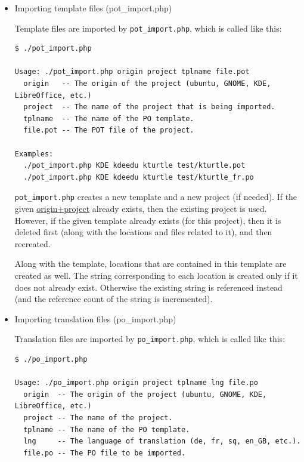 \documentclass[11pt]{article}
\begin{document}
\begin{itemize}

\item Importing template files (pot\_{}import.php)\\
\label{sec-8.4.2.1}


     Template files are imported by \texttt{pot\_import.php}, which is called
     like this:

\begin{verbatim}
$ ./pot_import.php

Usage: ./pot_import.php origin project tplname file.pot
  origin   -- The origin of the project (ubuntu, GNOME, KDE, LibreOffice, etc.)
  project  -- The name of the project that is being imported.
  tplname  -- The name of the PO template.
  file.pot -- The POT file of the project.

Examples:
  ./pot_import.php KDE kdeedu kturtle test/kturtle.pot
  ./pot_import.php KDE kdeedu kturtle test/kturtle_fr.po
\end{verbatim}



     \texttt{pot\_import.php} creates a new template and a new project (if
     needed).  If the given \underline{origin+project} already exists, then the
     existing project is used.  However, if the given template already
     exists (for this project), then it is deleted first (along with the
     locations and files related to it), and then recreated.

     Along with the template, locations that are contained in this
     template are created as well. The string corresponding to each
     location is created only if it does not already exist. Otherwise
     the existing string is referenced instead (and the reference count
     of the string is incremented).


\item Importing translation files (po\_{}import.php)\\
\label{sec-8.4.2.2}


     Translation files are imported by \texttt{po\_import.php}, which is called
     like this:

\begin{verbatim}
$ ./po_import.php

Usage: ./po_import.php origin project tplname lng file.po
  origin  -- The origin of the project (ubuntu, GNOME, KDE, LibreOffice, etc.)
  project -- The name of the project.
  tplname -- The name of the PO template.
  lng     -- The language of translation (de, fr, sq, en_GB, etc.).
  file.po -- The PO file to be imported.


\end{verbatim}
\end{itemize}
\end{document}
